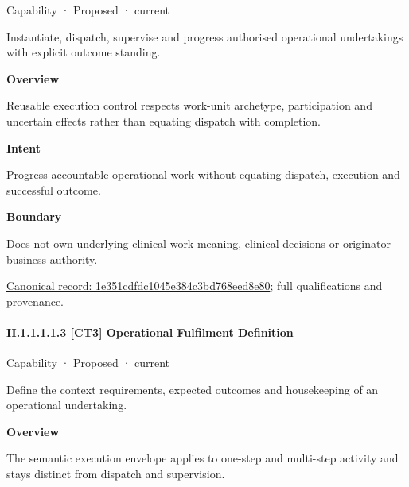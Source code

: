 \label{element:1e351cdfdc1045e384c3bd768eed8e80}
{\small Capability · Proposed · current}\par

Instantiate, dispatch, supervise and progress authorised operational undertakings with explicit outcome standing.



\textbf{Overview}



Reusable execution control respects work-unit archetype, participation and uncertain effects rather than equating dispatch with completion.



\textbf{Intent}



Progress accountable operational work without equating dispatch, execution and successful outcome.



\textbf{Boundary}



Does not own underlying clinical-work meaning, clinical decisions or originator business authority.


{\footnotesize \href{../../../../../../../continuum/strategy/capability/1e351cdfdc1045e384c3bd768eed8e80.md}{Canonical record: 1e351cdfdc1045e384c3bd768eed8e80}; full qualifications and provenance.}\par
\paragraph*{II.1.1.1.1.3 [CT3] Operational Fulfilment Definition}
\label{navigation:II.1.1.1.1.3}

\label{element:2b52c0de17b146da962f303e99f90a4a}
{\small Capability · Proposed · current}\par

Define the context requirements, expected outcomes and housekeeping of an operational undertaking.



\textbf{Overview}



The semantic execution envelope applies to one-step and multi-step activity and stays distinct from dispatch and supervision.



